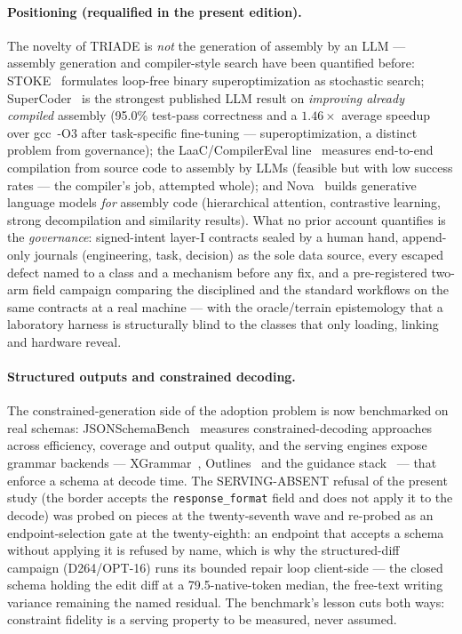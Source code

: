 \documentclass[10pt,a4paper]{article}
\newcommand{\code}[1]{\texttt{\small #1}}
\begin{document}
\paragraph{Positioning (requalified in the present edition).}
The novelty of TRIADE is \emph{not} the generation of assembly by an
LLM --- assembly generation and compiler-style search have been
quantified before: STOKE~\cite{stoke} formulates loop-free binary
superoptimization as stochastic search; SuperCoder~\cite{supercoder}
is the strongest published LLM result on \emph{improving already
compiled} assembly (95.0\% test-pass correctness and a $1.46\times$
average speedup over gcc~-O3 after task-specific fine-tuning ---
superoptimization, a distinct problem from governance);
the LaaC/CompilerEval line~\cite{laac} measures end-to-end compilation
from source code to assembly by LLMs (feasible but with low success
rates --- the compiler's job, attempted whole);
and Nova~\cite{nova} builds generative language models \emph{for}
assembly code (hierarchical attention, contrastive learning, strong
decompilation and similarity results). What no
prior account quantifies is the \emph{governance}: signed-intent
layer-I contracts sealed by a human hand, append-only journals
(engineering, task, decision) as the sole data source, every escaped
defect named to a class and a mechanism before any fix, and a
pre-registered two-arm field campaign comparing the disciplined and
the standard workflows on the same contracts at a real machine ---
with the oracle/terrain epistemology that a laboratory harness is
structurally blind to the classes that only loading, linking and
hardware reveal.

\paragraph{Structured outputs and constrained decoding.}
The constrained-generation side of the adoption problem is now
benchmarked on real schemas: JSONSchemaBench~\cite{jsonschemabench}
measures constrained-decoding approaches across efficiency, coverage
and output quality, and the serving engines expose grammar backends
--- XGrammar~\cite{xgrammar}, Outlines~\cite{outlines} and the
guidance stack~\cite{guidance} --- that enforce a schema at decode
time. The SERVING-ABSENT refusal of the present study (the border
accepts the \code{response\_format} field and does not apply it to
the decode) was probed on pieces at the twenty-seventh wave and
re-probed as an endpoint-selection gate at the twenty-eighth: an
endpoint that accepts a schema without applying it is refused by
name, which is why the structured-diff campaign (D264/OPT-16) runs
its bounded repair loop client-side --- the closed schema holding the
edit diff at a 79.5-native-token median, the free-text writing
variance remaining the named residual. The benchmark's lesson cuts
both ways: constraint fidelity is a serving property to be measured,
never assumed.
\end{document}
